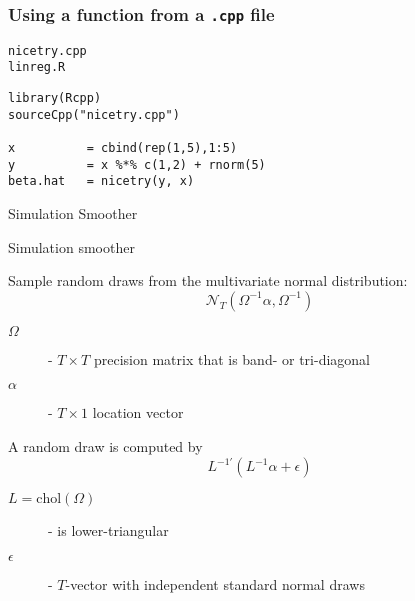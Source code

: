 \documentclass[notes,blackandwhite,mathsans]{beamer}
\begin{document}
{\begin{frame}[fragile]
\frametitle{Using a function from a \texttt{.cpp} file}

\texttt{nicetry.cpp}\\


\texttt{linreg.R}\\
\begin{lstlisting}[frame=trBL ]
library(Rcpp)
sourceCpp("nicetry.cpp")

x          = cbind(rep(1,5),1:5)
y          = x %*% c(1,2) + rnorm(5)
beta.hat   = nicetry(y, x)
\end{lstlisting}


\end{frame}











{
\begin{frame}

\begin{adjustwidth}{-0.5cm}{0cm}
\FlushLeft
\vspace{8.0cm}\LARGE
{{\color{black}Simulation} {\color{lightgray}Smoother}}
\end{adjustwidth}

\end{frame}
}






\begin{frame}{Simulation smoother}

{\color{darkgray}Sample random draws from the multivariate normal distribution:}
$$ \mathcal{N}_T\left(\Omega^{-1}\alpha, \Omega^{-1}\right) $$

\begin{description}
\item[$\Omega$] - $T\times T$ {\color{darkgray}precision matrix that is band- or tri-diagonal}
\item[$\alpha$] - $T\times1$ {\color{darkgray}location vector}
\end{description}

\bigskip
{\color{darkgray}A random draw is computed by}
$$
L^{-1\prime}\left(L^{-1}\alpha + \epsilon\right)
$$
\begin{description}
\item[$L=\text{chol}(\Omega)$] {\color{darkgray}- is lower-triangular}
\item[$\epsilon$] - $T${\color{darkgray}-vector with independent standard normal draws}
\end{description}
\end{frame}









}
\end{document}
